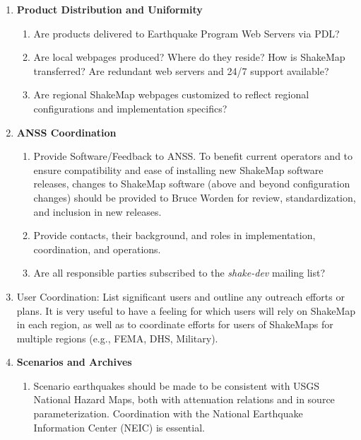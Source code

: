 \documentclass[letterpaper,10pt,english]{sphinxmanual}
\begin{document}
\begin{enumerate}
\begin{enumerate}
\end{enumerate}

\item {} 
\textbf{Product Distribution and Uniformity}
\begin{enumerate}
\item {} 
Are products delivered to Earthquake Program Web Servers via PDL?

\item {} 
Are local webpages produced? Where do they reside? How is ShakeMap
transferred? Are redundant web servers and 24/7 support available?

\item {} 
Are regional ShakeMap webpages customized to reflect regional
configurations and implementation specifics?

\end{enumerate}

\item {} 
\textbf{ANSS Coordination}
\begin{enumerate}
\item {} 
Provide Software/Feedback to ANSS.  To benefit current operators and to
ensure compatibility and ease of installing new ShakeMap software releases,
changes to ShakeMap software (above and beyond configuration changes)
should be provided to Bruce Worden for review, standardization, and
inclusion in new releases.

\item {} 
Provide contacts, their background, and roles in implementation, coordination,
and operations.

\item {} 
Are all responsible parties subscribed to the \emph{shake-dev} mailing list?

\end{enumerate}

\item {} 
User Coordination:
List significant users and outline any outreach efforts or plans. It is very useful to
have a feeling for which users will rely on ShakeMap in each region, as well as to
coordinate efforts for users of ShakeMaps for multiple regions (e.g., FEMA,
DHS, Military).

\item {} 
\textbf{Scenarios and Archives}
\begin{enumerate}
\item {} 
Scenario earthquakes should be made to be consistent with USGS National
Hazard Maps, both with attenuation relations and in source parameterization.
Coordination with the National Earthquake Information Center (NEIC) is essential.


\end{enumerate}
\end{enumerate}
\end{document}
